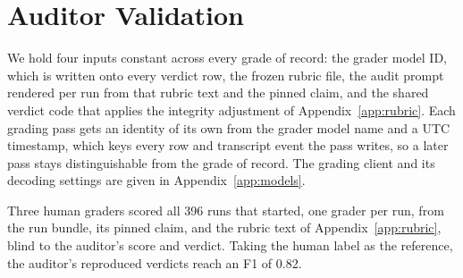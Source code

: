 \section{Auditor Validation}
\label{app:auditor-validation}

We hold four inputs constant across every grade of record: the grader model ID,
which is written onto every verdict row, the frozen rubric file, the audit prompt rendered per run from that rubric text and the
pinned claim, and the shared verdict code that applies the integrity adjustment
of Appendix~\ref{app:rubric}. Each grading pass gets an identity of its own from
the grader model name and a UTC timestamp, which keys every row and transcript
event the pass writes, so a later pass stays distinguishable from the grade of
record. The grading client and its decoding settings are given in
Appendix~\ref{app:models}.

Three human graders scored all 396 runs that started, one grader per run, from
the run bundle, its pinned claim, and the rubric text of
Appendix~\ref{app:rubric}, blind to the auditor's score and verdict. Taking the
human label as the reference, the auditor's reproduced verdicts reach an F1 of
0.82.

\FloatBarrier  %
